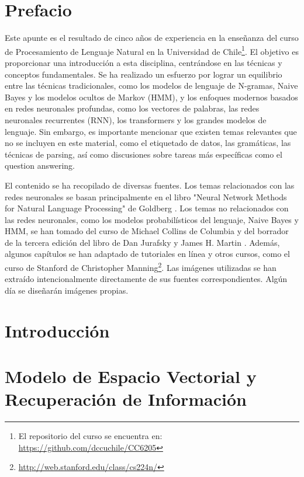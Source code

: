 \documentclass{book}
\begin{document}
\chapter*{Prefacio}
Este apunte es el resultado de cinco años de experiencia en la enseñanza del curso de Procesamiento de Lenguaje Natural en la Universidad de Chile\footnote{El repositorio del curso se encuentra en: \url{https://github.com/dccuchile/CC6205}}. El objetivo es proporcionar una introducción a esta disciplina, centrándose en las técnicas y conceptos fundamentales. Se ha realizado un esfuerzo por lograr un equilibrio entre las técnicas tradicionales, como los modelos de lenguaje de N-gramas, Naive Bayes y los modelos ocultos de Markov (HMM), y los enfoques modernos basados en redes neuronales profundas, como los vectores de palabras, las redes neuronales recurrentes (RNN), los transformers y los grandes modelos de lenguaje. Sin embargo, es importante mencionar que existen temas relevantes que no se incluyen en este material, como el etiquetado de datos, las gramáticas, las técnicas de parsing, así como discusiones sobre tareas más específicas como el question answering.

El contenido se ha recopilado de diversas fuentes. Los temas relacionados con las redes neuronales se basan principalmente en el libro "Neural Network Methods for Natural Language Processing" de Goldberg \cite{goldberg2017neural}. Los temas no relacionados con las redes neuronales, como los modelos probabilísticos del lenguaje, Naive Bayes y HMM, se han tomado del curso de Michael Collins de Columbia \cite{collins2013language} y del borrador de la tercera edición del libro de Dan Jurafsky y James H. Martin \cite{JurafskyBook}. Además, algunos capítulos se han adaptado de tutoriales en línea y otros cursos, como el curso de Stanford de Christopher Manning\footnote{\url{http://web.stanford.edu/class/cs224n/}}. Las imágenes utilizadas se han extraído intencionalmente directamente de sus fuentes correspondientes. Algún día se diseñarán imágenes propias.

\chapter{Introducción}
\label{cap:intro}




\chapter{Modelo de Espacio Vectorial y Recuperación de Información}
\label{cap_ir}

\end{document}
